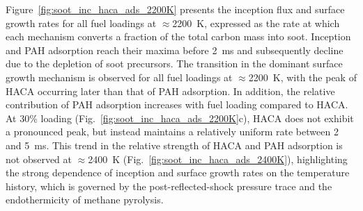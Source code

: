 Figure~\ref{fig:soot_inc_haca_ads_2200K} presents the inception flux and surface growth rates for all fuel loadings at $\approx$2200~K, expressed as the rate at which each mechanism converts a fraction of the total carbon mass into soot. Inception and PAH adsorption reach their maxima before 2~ms and subsequently decline due to the depletion of soot precursors. The transition in the dominant surface growth mechanism is observed for all fuel loadings at $\approx$2200~K, with the peak of HACA occurring later than that of PAH adsorption. In addition, the relative contribution of PAH adsorption increases with fuel loading compared to HACA. At 30\% loading (Fig.~\ref{fig:soot_inc_haca_ads_2200K}c), HACA does not exhibit a pronounced peak, but instead maintains a relatively uniform rate between 2 and 5~ms. This trend in the relative strength of HACA and PAH adsorption is not observed at $\approx$2400~K (Fig.~\ref{fig:soot_inc_haca_ads_2400K}), highlighting the strong dependence of inception and surface growth rates on the temperature history, which is governed by the post-reflected-shock pressure trace and the endothermicity of methane pyrolysis.
